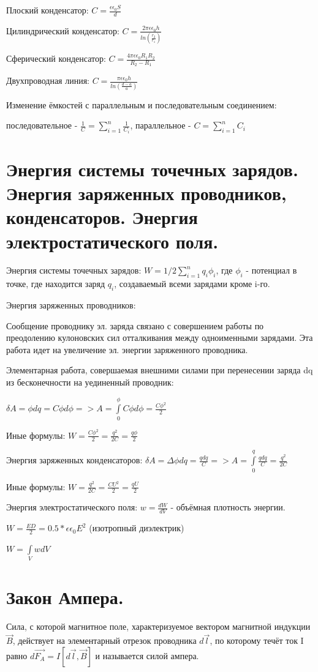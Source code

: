 \documentclass[12pt]{report}
\begin{document}
Плоский конденсатор: $C = \frac{\epsilon \epsilon_0 S}{d}$

Цилиндрический конденсатор: $C = \frac{2 \pi \epsilon \epsilon_0 h}{ln(\frac{r_2}{r_1})}$

Сферический конденсатор: $C = \frac{4 \pi \epsilon \epsilon_0 R_1 R_2}{R_2 - R_1}$

Двухпроводная линия: $C = \frac{\pi \epsilon \epsilon_0 h}{ln(\frac{d - a}{a})}$

Изменение ёмкостей с параллельным и последовательным соединением:

последовательное - $\frac{1}{C} = \sum\limits_{i=1}^{n} \frac{1}{C_i}$, параллельное - $C = \sum\limits_{i=1}^n C_i$

\section{Энергия системы точечных зарядов. Энергия заряженных проводников, конденсаторов. Энергия электростатического поля.}
Энергия системы точечных зарядов: $W = 1/2 \sum\limits_{i=1}^{n} q_i \phi_i$, где $\phi_i$ - потенциал в точке, где находится заряд $q_i$, создаваемый всеми зарядами кроме i-го.

Энергия заряженных проводников:

Сообщение проводнику эл. заряда связано с совершением работы по
преодолению кулоновских сил отталкивания между одноименными
зарядами. Эта работа идет на увеличение эл. энергии заряженного
проводника.

Элементарная работа, совершаемая внешними силами при перенесении заряда dq из бесконечности на уединенный проводник:

$\delta A = \phi dq = C \phi d\phi => A = \int\limits_{0}^{\phi} C\phi d\phi = \frac{C \phi^2}{2}$

Иные формулы: $W = \frac{C \phi^2}{2} = \frac{q^2}{2C} = \frac{q \phi}{2}$

Энергия заряженных конденсаторов: $\delta A = \Delta\phi dq = \frac{qdq}{C} => A = \int\limits_{0}^{q} \frac{qdq}{C} = \frac{q^2}{2C}$

Иные формулы: $W = \frac{q^2}{2C} = \frac{CU^2}{2} = \frac{qU}{2}$

Энергия электростатического поля: $w = \frac{dW}{dV}$ - объёмная плотность энергии.

$W = \frac{ED}{2} = 0.5*\epsilon \epsilon_0 E^2$ (изотропный диэлектрик)

$W = \int\limits_{V} wdV$

\section{Закон Ампера.}
Сила, с которой магнитное поле, характеризуемое вектором магнитной индукции $\stackrel{\xrightarrow{}}{B}$, действует на элементарный отрезок проводника $d\stackrel{\xrightarrow{}}{l}$, по которому течёт ток I равно $d\stackrel{\xrightarrow{}}{F_A} = I[d\stackrel{\xrightarrow{}}{l}, \stackrel{\xrightarrow{}}{B}]$ и называется силой ампера.
\end{document}

